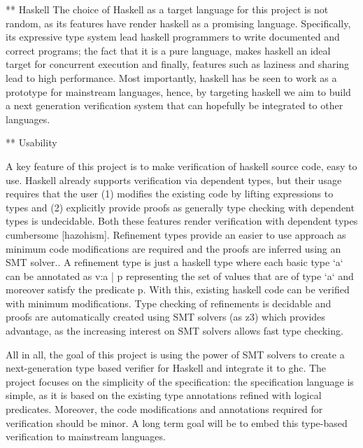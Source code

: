 ** Haskell
The choice of Haskell as a target language for this project is not random, as its features have render haskell as a promising language.
Specifically, its expressive type system lead haskell programmers to write documented and  correct programs; the fact that it is a pure language, makes haskell an ideal target for concurrent execution and finally, features such as laziness and sharing lead to high performance. 
Most importantly, haskell has be seen to work as a prototype for mainstream languages,
hence, by targeting haskell we aim to build a next generation verification system that can hopefully be integrated to other languages.



** Usability

A key feature of this project is to make verification of haskell source code, easy to use.
Haskell already supports verification via dependent types, but their usage requires that the user
(1) modifies the existing code by lifting expressions to types
and (2) explicitly provide proofs as generally type checking with dependent types is undecidable.
Both these features render verification with dependent types cumbersome [hazohism].
%
Refinement types provide an easier to use approach as minimum code modifications are required 
and the proofs are inferred using an SMT solver..
%
A refinement type is just a haskell type where each basic type `a` can be annotated as 
{v:a | p} representing the set of values that are of type `a` and moreover satisfy the predicate p.
With this, existing haskell code can be verified with minimum modifications.
% 
Type checking of refinements is decidable and proofs are automatically created using SMT solvers (as z3) which provides advantage, as the increasing interest on SMT solvers allows fast type checking.

All in all, the goal of this project is using the power of SMT solvers to 
create a next-generation type based verifier for Haskell and integrate it to ghc.
The project focuses on the simplicity of the specification:
the specification language is simple, as it is based on the existing type annotations
refined with logical predicates.
Moreover, the code modifications and annotations required for verification should be minor.
A long term goal will be to embed this type-based verification to mainstream languages.




